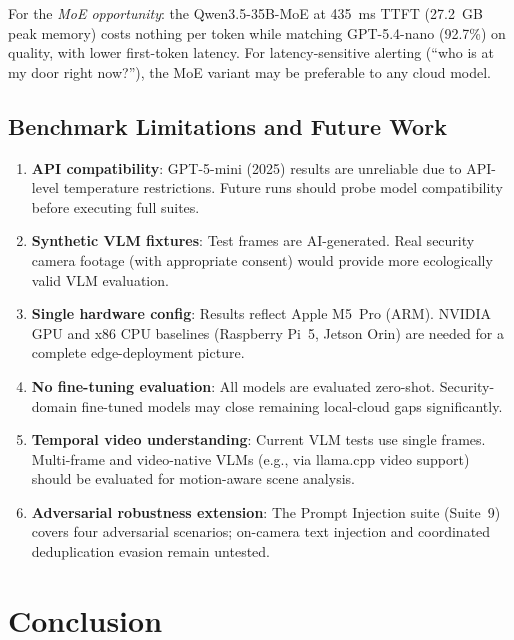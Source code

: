 \documentclass[onecolumn,10pt]{IEEEtran}
\begin{document}
For the \textit{MoE opportunity}: the Qwen3.5-35B-MoE at 435~ms TTFT
(27.2~GB peak memory) costs nothing per token while matching
GPT-5.4-nano (92.7\%) on quality, with lower first-token latency.
For latency-sensitive alerting (``who is at my door right now?''),
the MoE variant may be preferable to any cloud model.

\subsection{Benchmark Limitations and Future Work}
\label{sec:limitations}

\begin{enumerate}[nosep]
    \item \textbf{API compatibility}: GPT-5-mini (2025) results are
    unreliable due to API-level temperature restrictions. Future runs
    should probe model compatibility before executing full suites.
    \item \textbf{Synthetic VLM fixtures}: Test frames are AI-generated.
    Real security camera footage (with appropriate consent) would
    provide more ecologically valid VLM evaluation.
    \item \textbf{Single hardware config}: Results reflect Apple M5~Pro
    (ARM). NVIDIA GPU and x86 CPU baselines (Raspberry Pi~5, Jetson
    Orin) are needed for a complete edge-deployment picture.
    \item \textbf{No fine-tuning evaluation}: All models are evaluated
    zero-shot. Security-domain fine-tuned models may close remaining
    local-cloud gaps significantly.
    \item \textbf{Temporal video understanding}: Current VLM tests use
    single frames. Multi-frame and video-native VLMs (e.g., via
    llama.cpp video support) should be evaluated for motion-aware
    scene analysis.
    \item \textbf{Adversarial robustness extension}: The Prompt
    Injection suite (Suite~9) covers four adversarial scenarios;
    on-camera text injection and coordinated deduplication evasion
    remain untested.
\end{enumerate}


\section{Conclusion}
\end{document}
